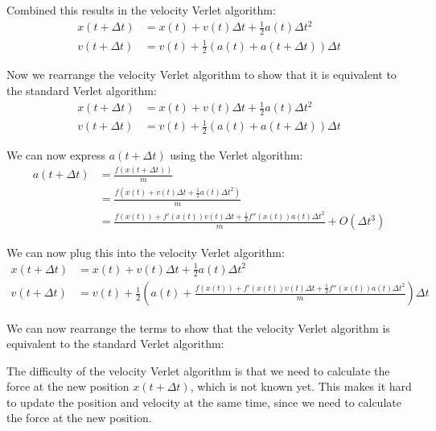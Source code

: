 \documentclass[a4paper,11pt,bibtotoc]{scrartcl}
\begin{document}
Combined this results in the velocity Verlet algorithm:
\begin{align}
	x(t + \Delta t) &= x(t) + v(t) \Delta t + \frac{1}{2} a(t) \Delta t^2 \\
	v(t + \Delta t) &= v(t) + \frac{1}{2} (a(t) + a(t + \Delta t)) \Delta t 
\end{align}	

Now we rearrange the velocity Verlet algorithm to show that it is equivalent to the standard Verlet algorithm:
\begin{align}
	x(t + \Delta t) &= x(t) + v(t) \Delta t + \frac{1}{2} a(t) \Delta t^2 \\
	v(t + \Delta t) &= v(t) + \frac{1}{2} (a(t) + a(t + \Delta t)) \Delta t
\end{align}

We can now express $a(t + \Delta t)$ using the Verlet algorithm:
\begin{align}
	a(t + \Delta t) &= \frac{f(x(t + \Delta t))}{m} \\
	&= \frac{f(x(t) + v(t) \Delta t + \frac{1}{2} a(t) \Delta t^2)}{m} \\
	&= \frac{f(x(t)) + f'(x(t)) v(t) \Delta t + \frac{1}{2} f''(x(t)) a(t) \Delta t^2}{m} + O(\Delta t^3)
\end{align}

We can now plug this into the velocity Verlet algorithm:
\begin{align}
	x(t + \Delta t) &= x(t) + v(t) \Delta t + \frac{1}{2} a(t) \Delta t^2 \\
	v(t + \Delta t) &= v(t) + \frac{1}{2} (a(t) + \frac{f(x(t)) + f'(x(t)) v(t) \Delta t + \frac{1}{2} f''(x(t)) a(t) \Delta t^2}{m}) \Delta t
\end{align}

We can now rearrange the terms to show that the velocity Verlet algorithm is equivalent to the standard Verlet algorithm:


The difficulty of the velocity Verlet algorithm is that we need to calculate the force at the new position $x(t + \Delta t)$, which is not known yet.
This makes it hard to update the position and velocity at the same time, since we need to calculate the force at the new position.
\end{document}
